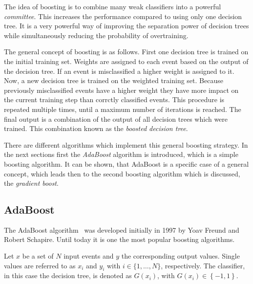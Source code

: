 The idea of boosting is to combine many weak classifiers into a powerful \emph{committee}.
This increases the performance compared to using only one decision tree.
It is a very powerful way of improving the separation power of decision trees while
simultaneously reducing the probability of overtraining.

The general concept of boosting is as follows.
First one decision tree is trained on the initial training set.
Weights are assigned to each event based on the output of the decision tree.
If an event is misclassified a higher weight is assigned to it.
Now, a new decision tree is trained on the weighted training set.
Because previously misclassified events have a higher weight they have more impact on the current training step
than corrctly classified events.
This procedure is repeated multiple times, until a maximum number of iterations is reached.
The final output is a combination of the output of all decision trees which were trained.
This combination known as the \emph{boosted decision tree}.

There are different algorithms which implement this general boosting strategy.
In the next sections first the \emph{AdaBoost} algorithm is introduced, which is a simple boosting algorithm.
It can be shown, that AdaBoost is a specific case of a general concept, which leads then to the second
boosting algorithm which is discussed, the \emph{gradient boost}.

\subsection{AdaBoost}\label{sub:bdt:boosting:adaboost}

The AdaBoost algorithm~\cite{AdaBoost} was developed initially in 1997 by Yoav Freund and Robert Schapire.
Until today it is one the most popular boosting algorithms.

Let $x$ be a set of $N$ input events and $y$ the corresponding output values.
Single values are referred to as $x_i$ and $y_i$ with $i \in \{1, \ldots, N\}$, respectively.
The classifier, in this case the decision tree, is denoted as $G(x_i)$, with $G(x_i) \in \left\{ -1,1 \right\}$.

